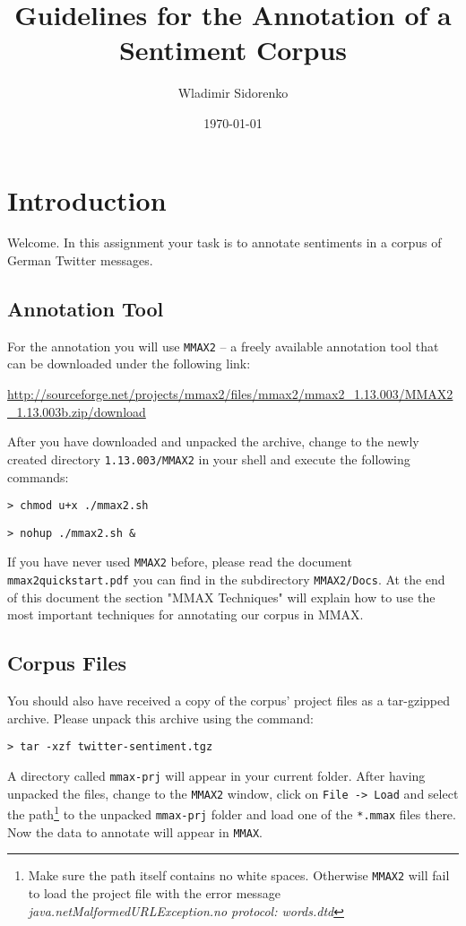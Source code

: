 \documentclass[11pt,a4paper]{article}
\author{Wladimir Sidorenko}
\date{\today}
\title{Guidelines for the Annotation of a Sentiment Corpus}
\begin{document}
\maketitle{}
\section{Introduction}
Welcome. In this assignment your task is to annotate sentiments in a
corpus of German Twitter messages.

\subsection{Annotation Tool}

For the annotation you will use \texttt{MMAX2} -- a freely available
annotation tool that can be downloaded under the following link:

\url{http://sourceforge.net/projects/mmax2/files/mmax2/mmax2_1.13.003/MMAX2_1.13.003b.zip/download}

After you have downloaded and unpacked the archive, change to the
newly created directory \texttt{1.13.003/MMAX2} in your shell and
execute the following commands: \newline

\texttt{> chmod u+x ./mmax2.sh}

\texttt{> nohup ./mmax2.sh \&} \newline

{\setlength{\parindent}{0pt} If you have never used \texttt{MMAX2}
  before, please read the document \texttt{mmax2quickstart.pdf}
  you can find in the subdirectory \texttt{MMAX2/Docs}. At the end of 
  this document the section "MMAX Techniques" will explain how to use the most 
  important techniques for annotating our corpus in MMAX.}

\subsection{Corpus Files}

You should also have received a copy of the corpus' project files as a
tar-gzipped archive.  Please unpack this archive using the
command: \newline

\texttt{> tar -xzf twitter-sentiment.tgz} \newline

{\setlength{\parindent}{0pt} A directory called
  \texttt{mmax-prj} will appear in your current folder. After having unpacked the files, change to the 
	\texttt{MMAX2} window, click on \texttt{File -> Load} and select the path\footnote{Make sure the path itself contains no
    white spaces. Otherwise \texttt{MMAX2} will fail to load the
    project file with the error message \emph{java.netMalformedURLException.no protocol: words.dtd}} 
    to the unpacked \texttt{mmax-prj} folder and load one of the \texttt{*.mmax} files there. 
    Now the data to annotate will appear in \texttt{MMAX}.}
\end{document}
